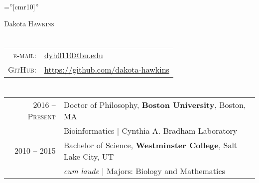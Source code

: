 \documentclass[a4paper,10pt]{article}
\begin{document}
\pagestyle{empty} %

\font\fb=''[cmr10]'' %

\par{\centering
		{\Huge Dakota \textsc{Hawkins}
	}\bigskip\par}

\section{\color{linkcolour}{Contact}}

\begin{tabular}{rl}
    \textsc{e-mail:}  & \href{mailto:dyh0110@bu.edu}{dyh0110@bu.edu} \\
    \textsc{GitHub:}  & \href{https://github.com/dakota-hawkins}{https://github.com/dakota-hawkins}
\end{tabular}

\section{\color{linkcolour}{Education}}
\begin{tabular}{rl}
\textsc{2016 -- Present} & Doctor of Philosophy, \textbf{Boston University}, Boston, MA \\
& Bioinformatics | Cynthia A. Bradham Laboratory \\

 \textsc{2010 -- 2015} & Bachelor of Science, \textbf{Westminster College}, Salt Lake City, UT\\
& \emph{cum laude} | Majors: Biology and Mathematics\\
\end{tabular}

\end{document}
